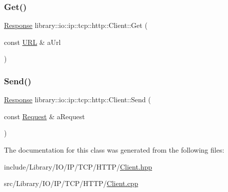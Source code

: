 \mbox{\label{classlibrary_1_1io_1_1ip_1_1tcp_1_1http_1_1_client_a1c3b8e761e1cca7c7f9737d06a42fed0}} 
\subsubsection{\texorpdfstring{Get()}{Get()}}
{\footnotesize\ttfamily \hyperlink{classlibrary_1_1io_1_1ip_1_1tcp_1_1http_1_1_response}{Response} library\+::io\+::ip\+::tcp\+::http\+::\+Client\+::\+Get (\begin{DoxyParamCaption}\item[{const \hyperlink{classlibrary_1_1io_1_1_u_r_l}{U\+RL} \&}]{a\+Url }\end{DoxyParamCaption})\hspace{0.3cm}{\ttfamily [static]}}

\mbox{\label{classlibrary_1_1io_1_1ip_1_1tcp_1_1http_1_1_client_adb337267064f9d3f2530af896f7e8df8}} 
\subsubsection{\texorpdfstring{Send()}{Send()}}
{\footnotesize\ttfamily \hyperlink{classlibrary_1_1io_1_1ip_1_1tcp_1_1http_1_1_response}{Response} library\+::io\+::ip\+::tcp\+::http\+::\+Client\+::\+Send (\begin{DoxyParamCaption}\item[{const \hyperlink{classlibrary_1_1io_1_1ip_1_1tcp_1_1http_1_1_request}{Request} \&}]{a\+Request }\end{DoxyParamCaption})\hspace{0.3cm}{\ttfamily [static]}}



The documentation for this class was generated from the following files\+:\begin{DoxyCompactItemize}
\item 
include/\+Library/\+I\+O/\+I\+P/\+T\+C\+P/\+H\+T\+T\+P/\hyperlink{_h_t_t_p_2_client_8hpp}{Client.\+hpp}\item 
src/\+Library/\+I\+O/\+I\+P/\+T\+C\+P/\+H\+T\+T\+P/\hyperlink{_client_8cpp}{Client.\+cpp}\end{DoxyCompactItemize}
